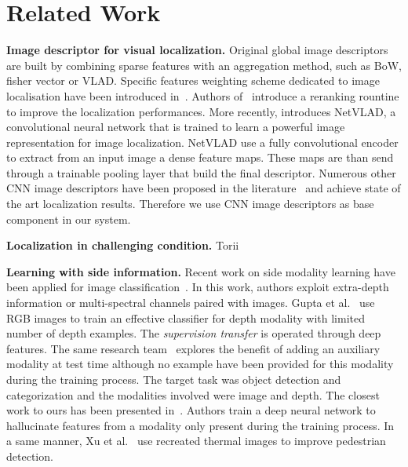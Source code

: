 \section{Related Work}
\label{sec:related_work}

\vspace{4pt}\noindent\textbf{Image descriptor for visual localization.} Original global image descriptors are built by combining sparse features with an aggregation method, such as BoW, fisher vector or VLAD. Specific features weighting scheme dedicated to image localisation have been introduced in~\cite{Arandjelovic2014}. Authors of~\cite{Sattler2016} introduce a reranking rountine to improve the localization performances. More recently, \cite{Arandjelovic2017} introduces NetVLAD, a convolutional neural network that is trained to learn a powerful image representation for image localization. NetVLAD use a fully convolutional encoder to extract from an input image a dense feature maps. These maps are than send through a trainable pooling layer that build the final descriptor. Numerous other CNN image descriptors have been proposed in the literature~\cite{Kim2017a,Gordo2017,Radenovic2017,Sunderhauf2015a,Liu2018} and achieve state of the art localization results. Therefore we use CNN image descriptors as base component in our system.

\vspace{4pt}\noindent\textbf{Localization in challenging condition.} Torii

\vspace{4pt}\noindent\textbf{Learning with side information.} Recent work on side modality learning have been applied for image classification~\cite{Zhang2014}. In this work, authors exploit extra-depth information or multi-spectral channels paired with images. Gupta et al.~\cite{Gupta2016a} use RGB images to train an effective classifier for depth modality with limited number of depth examples. The \textit{supervision transfer} is operated through deep features. The same research team~\cite{Hoffman2016a} explores the benefit of adding an auxiliary modality at test time although no example have been provided for this modality during the training process. The target task was object detection and categorization and the modalities involved were image and depth. The closest work to ours has been presented in~\cite{Hoffman2016}. Authors train a deep neural network to hallucinate features from a modality only present during the training process. In a same manner, Xu et al.~\cite{xu2017learning} use recreated thermal images to improve pedestrian detection.
